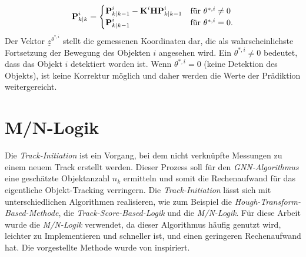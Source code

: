\documentclass[10pt,a4paper]{article}
\begin{document}
\begin{equation*}
\textbf{P}^i_{k|k} = \begin{cases}
\textbf{P}^i_{k|k-1}-\textbf{K}^i\textbf{H}\textbf{P}^i_{k|k-1} &$für $ \theta^{*,i} \neq 0 \\
\textbf{P}^i_{k|k-1} & $für $ \theta^{*,i} = 0.
\end{cases}
\end{equation*}
Der Vektor $\underline{z}^{\theta^{*,i}}$ stellt die gemessenen Koordinaten dar, die als wahrscheinlichste Fortsetzung der Bewegung des Objekten $i$ angesehen wird. Ein $ \theta^{*,i} \neq 0$ bedeutet, dass das Objekt $i$ detektiert worden ist. Wenn $\theta^{*,i} = 0$ (keine Detektion des Objekts), ist keine Korrektur möglich und daher werden die Werte der Prädiktion weitergereicht.

\section{M/N-Logik}	
	Die \textit{Track-Initiation} ist ein Vorgang, bei dem nicht verknüpfte Messungen zu einem neuem Track erstellt werden. Dieser Prozess soll für den \textit{GNN-Algorithmus} eine geschätzte Objektanzahl $n_k$ ermitteln und somit die Rechenaufwand für das eigentliche Objekt-Tracking verringern. Die \textit{Track-Initiation} lässt sich mit unterschiedlichen Algorithmen realisieren, wie zum Beispiel die \textit{Hough-Transform-Based-Methode}, die \textit{Track-Score-Based-Logik} und die \textit{M/N-Logik}. Für diese Arbeit wurde die \textit{M/N-Logik} verwendet, da dieser Algorithmus häufig genutzt wird, leichter zu Implementieren und schneller ist, und einen geringeren Rechenaufwand hat. Die vorgestellte Methode wurde von \cite{MN} inspiriert. 
\end{document}
